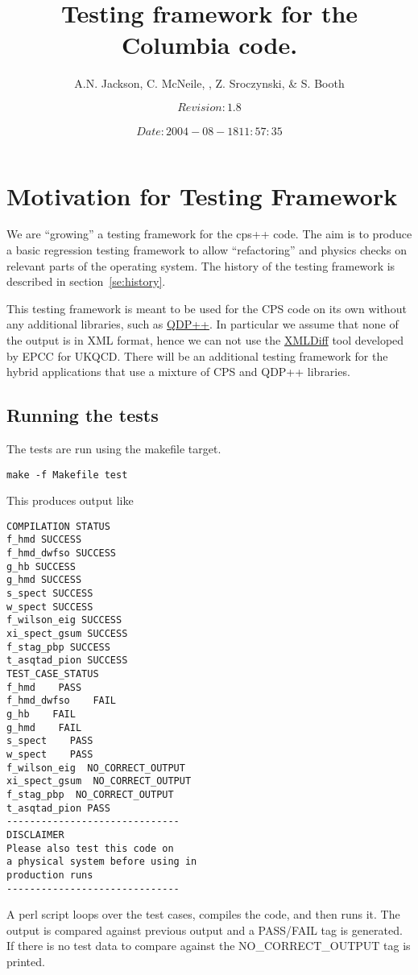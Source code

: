 \documentclass[12pt]{article}
\title{Testing framework for the Columbia code.}
\author{A.N. Jackson, C. McNeile, , Z. Sroczynski,  \& S. Booth}
\date{\mbox{\small $$Revision: 1.8 $$  $$Date: 2004-08-18 11:57:35 $$}}
\begin{document}
\maketitle

\tableofcontents
\newpage

\section{Motivation for Testing Framework}

We are ``growing'' a testing framework for the cps++ code.
The aim is to produce a basic regression testing framework to allow
``refactoring'' and physics checks on relevant parts of the operating
system.
The history of the testing framework is described in 
section~\ref{se:history}.


This testing framework is meant to be used for the CPS code on its own
without any additional libraries, such as 
\href{http://www.jlab.org/~edwards/qdp/}{QDP++}.
  In particular we
assume that none of the output is in XML format, hence we can not use the
\href{https://forge.nesc.ac.uk/projects/xmldiff/}{XMLDiff}
tool developed by EPCC for UKQCD.  There will be an additional
testing framework for the hybrid applications that use a mixture of
CPS and QDP++ libraries.

\subsection{Running the tests}

The tests are run using the makefile target.
\begin{verbatim}
make -f Makefile test
\end{verbatim}
This produces output like
\begin{verbatim}
COMPILATION STATUS
f_hmd SUCCESS
f_hmd_dwfso SUCCESS
g_hb SUCCESS
g_hmd SUCCESS
s_spect SUCCESS
w_spect SUCCESS
f_wilson_eig SUCCESS
xi_spect_gsum SUCCESS
f_stag_pbp SUCCESS
t_asqtad_pion SUCCESS
TEST_CASE_STATUS
f_hmd    PASS
f_hmd_dwfso    FAIL
g_hb    FAIL
g_hmd    FAIL
s_spect    PASS
w_spect    PASS
f_wilson_eig  NO_CORRECT_OUTPUT
xi_spect_gsum  NO_CORRECT_OUTPUT
f_stag_pbp  NO_CORRECT_OUTPUT
t_asqtad_pion PASS
------------------------------
DISCLAIMER
Please also test this code on
a physical system before using in
production runs
------------------------------
\end{verbatim}

A perl script loops over the test cases, compiles the code,
and then runs it. The output is compared against
previous output and a PASS/FAIL tag is generated.
If there is no test data to compare against the
NO\_CORRECT\_OUTPUT tag is printed.
\end{document}
